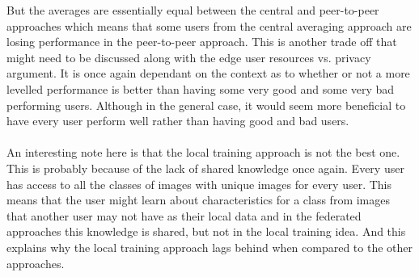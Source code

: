 \documentclass[12pt]{article}
\begin{document}
\begin{table}[H] %
\def\arraystretch{1.2}%
\caption{Images dataset: Post fit results at the end of the rounds from testing user models with $P = \tfrac{1}{8}$.} \label{tab:image_eq_post_fit}
\end{table}
\noindent But the averages are essentially equal between the central and peer-to-peer approaches which means that some users from the central averaging approach are losing performance in the peer-to-peer approach. This is another trade off that might need to be discussed along with the edge user resources vs. privacy argument. It is once again dependant on the context as to whether or not a more levelled performance is better than having some very good and some very bad performing users. Although in the general case, it would seem more beneficial to have every user perform well rather than having good and bad users. 
\\\\
An interesting note here is that the local training approach is not the best one. This is probably because of the lack of shared knowledge once again. Every user has access to all the classes of images with unique images for every user. This means that the user might learn about characteristics for a class from images that another user may not have as their local data and in the federated approaches this knowledge is shared, but not in the local training idea. And this explains why the local training approach lags behind when compared to the other approaches. 
\end{document}
